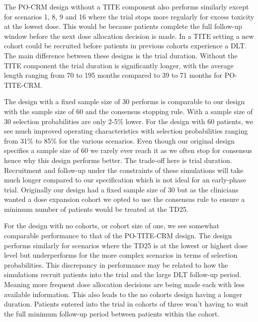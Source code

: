 The PO-CRM design without a TITE component also performs similarly except for scenarios 1, 8, 9 and 16 where the trial stops more regularly for excess toxicity at the lowest dose. This would be because patients complete the full follow-up window before the next dose allocation decision is made. In a TITE setting a new cohort could be recruited before patients in previous cohorts experience a DLT. The main difference between these designs is the trial duration. Without the TITE component the trial duration is significantly longer, with the average length ranging from 70 to 195 months compared to 39 to 71 months for PO-TITE-CRM. 

The design with a fixed sample size of 30 performs is comparable to our design with the sample size of 60 and the consensus stopping rule. With a sample size of 30 selection probabilities are only 2-5\% lower. For the design with 60 patients, we see much improved operating characteristics with selection probabilities ranging from 31\% to 85\% for the various scenarios. Even though our original design specifies a sample size of 60 we rarely ever reach it as we often stop for consensus hence why this design performs better. The trade-off here is trial duration. Recruitment and follow-up under the constraints of these simulations will take much longer compared to our specification which is not ideal for an early-phase trial. Originally our design had a fixed sample size of 30 but as the clinicians wanted a dose expansion cohort we opted to use the consensus rule to ensure a minimum number of patients would be treated at the TD25. 

For the design with no cohorts, or cohort size of one, we see somewhat comparable performance to that of the PO-TITE-CRM design. The design performs similarly for scenarios where the TD25 is at the lowest or highest dose level but underperforms for the more complex scenarios in terms of selection probabilities. This discrepancy in performance may be related to how the simulations recruit patients into the trial and the large DLT follow-up period. Meaning more frequent dose allocation decisions are being made each with less available information. This also leads to the no cohorts design having a longer duration. Patients entered into the trial in cohorts of three won't having to wait the full minimum follow-up period between patients within the cohort.




